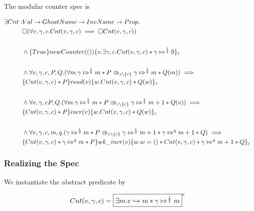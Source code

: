 The modular counter spec is 

\begin{align*}
\exists Cnt : & Val \rightarrow GhostName \rightarrow InvName \rightarrow Prop.\\
& \pemod{ ( \forall v, \gamma, c. \Cnt{v}{\gamma}{c} \implies \pemod{ \Cnt{v}{\gamma}{c} } ) } \\
\\
& \land \hot{True}{ newCounter(())}{v. \exists \gamma, c. \Cnt{v}{\gamma}{c} * \apointsto{\gamma}{0}{\frac{1}{2}}}_{\varepsilon} \\
\\
&  \land \forall v, \gamma, c, P, Q. (\forall m. \apointsto{\gamma}{m}{\frac{1}{2}} * P \Rrightarrow_{\varepsilon \backslash \{c\}} \apointsto{\gamma}{m}{\frac{1}{2}} * Q(m) ) \implies \\
& \hot{\Cnt{v}{\gamma}{c} * P}{read(v)}{w. \Cnt{v}{\gamma}{c} * Q(w)}_\varepsilon \\
\\
& \land \forall v, \gamma, c P, Q. (\forall m. \apointsto{\gamma}{m}{\frac{1}{2}} * P \Rrightarrow_{\varepsilon \backslash \{c\}} \apointsto{\gamma}{m + 1}{\frac{1}{2}} * Q(v)) \implies \\
& \hot{\Cnt{v}{\gamma}{c} * P}{incr(v)}{w. \Cnt{v}{\gamma}{c} * Q(w)}_{\varepsilon} \\
\\
& \land \forall v, \gamma, c, m, q.  (\apointsto{\gamma}{m}{\frac{1}{2}} * P \Rrightarrow_{\varepsilon \backslash \{ c \}} \apointsto{\gamma}{m + 1}{\frac{1}{2}} * \apointsto{\gamma}{m + 1}{q} * Q) \implies \\
& \hot{\Cnt{v}{\gamma}{c} * \apointsto{\gamma}{m}{q}  * P}{wk\_incr(v)}{w. w = () * \Cnt{v}{\gamma}{c} * \apointsto{\gamma}{m + 1}{q} * Q}_{\varepsilon}
\end{align*}

\subsubsection{Realizing the Spec}

We instantiate the abstract predicate by

\[
\Cnt{v}{\gamma}{c} = \invm{\exists m. \pointsto{v}{m} * \apointsto{\gamma}{m}{\frac{1}{2}}}{c}
\] 

